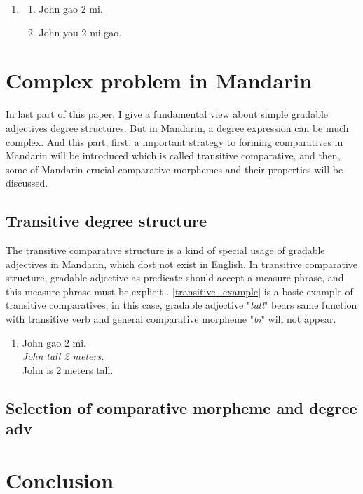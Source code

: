 \documentclass{ctexart}
\let \cite \parencite
\begin{document}
\begin{enumerate}[resume]
    \item
    \begin{enumerate}[ref=(\arabic{enumi}\alph*)]
        \item John gao 2 mi.
        \item John you 2 mi gao.
    \end{enumerate}
\end{enumerate}

\section{Complex problem in Mandarin}

In last part of this paper, I give a fundamental view about simple gradable adjectives degree structures. But in Mandarin, a degree expression can be much complex. And this part, first, a important strategy to forming comparatives in Mandarin will be introduced which is called transitive comparative, and then, some of Mandarin crucial comparative morphemes and their properties will be discussed.

\subsection{Transitive degree structure}

The transitive comparative structure is a kind of special usage of gradable adjectives in Mandarin, which dost not exist in English. In transitive comparative structure, gradable adjective as predicate should accept a measure phrase, and this measure phrase must be explicit \cite{grano2012}. \ref{transitive_example} is a basic example of transitive comparatives, in this case, gradable adjective "\textit{tall}" bears same function with transitive verb and general comparative morpheme "\textit{bi}" will not appear. 

\begin{enumerate}[resume]
    \item \label{transitive_example}
    John gao 2 mi. \\
    \textit{John tall 2 meters.} \\
    John is 2 meters tall.
\end{enumerate}

\subsection{Selection of comparative morpheme and degree adv}


\section{Conclusion}

\newpage

\printbibliography
\end{document}
